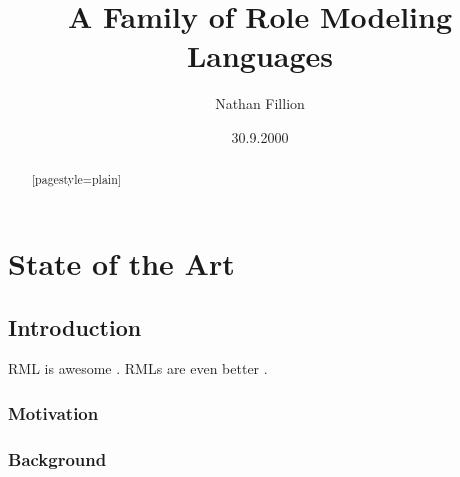 \documentclass[english,ngerman,BCOR=6mm,cdgeometry=no,DIV=13,twoside,cdmath=false]{tudscrreprt}
\begin{document}
\department{}
\date{30.9.2000}
\author{Nathan Fillion}
\title{A Family of Role Modeling Languages}








\dedication{For my loving children}

\renewcommand*{\partpagestyle}{plain}



\maketitle


\confirmation



\begin{abstract}[pagestyle=plain]
\blindtext
\nextabstract[ngerman]
\blindtext
\end{abstract}

\tableofcontents

\part{State of the Art}

\chapter{Introduction}\label{introduction}

\ac{RML} is awesome \citep{kuehn2014}. \acfp{RML} are even better
\citep{kuehn2014}.

\section{Motivation}\label{motivation}

\blindtext

\section{Background}\label{background}
\end{document}
